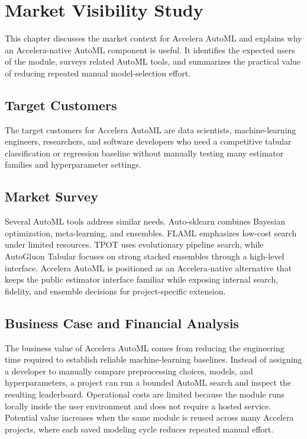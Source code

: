 \documentclass[12pt,a4paper,oneside]{report}
\newcommand{\systemname}{Accelera AutoML}
\begin{document}
\chapter{Market Visibility Study}
\label{chap:market}

This chapter discusses the market context for \systemname{} and explains why
an Accelera-native AutoML component is useful. It identifies the expected users
of the module, surveys related AutoML tools, and summarizes the practical value
of reducing repeated manual model-selection effort.

\section{Target Customers}

The target customers for \systemname{} are data scientists, machine-learning
engineers, researchers, and software developers who need a competitive tabular
classification or regression baseline without manually testing many estimator
families and hyperparameter settings.

\section{Market Survey}

Several AutoML tools address similar needs. Auto-sklearn combines Bayesian
optimization, meta-learning, and ensembles. FLAML emphasizes low-cost search
under limited resources. TPOT uses evolutionary pipeline search, while
AutoGluon Tabular focuses on strong stacked ensembles through a high-level
interface. \systemname{} is positioned as an Accelera-native alternative that
keeps the public estimator interface familiar while exposing internal search,
fidelity, and ensemble decisions for project-specific extension.

\section{Business Case and Financial Analysis}

The business value of \systemname{} comes from reducing the engineering time
required to establish reliable machine-learning baselines. Instead of assigning
a developer to manually compare preprocessing choices, models, and
hyperparameters, a project can run a bounded AutoML search and inspect the
resulting leaderboard. Operational costs are
limited because the module runs locally inside the user environment and does
not require a hosted service. Potential value increases when the same module is
reused across many Accelera projects, where each saved modeling cycle reduces
repeated manual effort.
\end{document}
